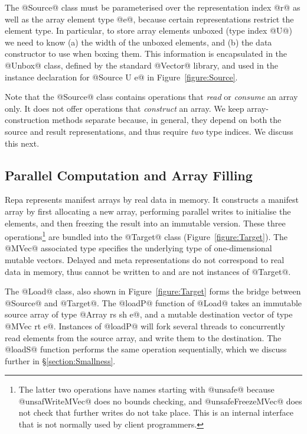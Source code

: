 The @Source@ class must be parameterised over the representation index @r@ as well as the array element type @e@, because certain representations restrict the element type. In particular, to store array elements unboxed (type index @U@) we need to know (a) the width of the unboxed elements, and (b) the data constructor to use when boxing them. This information is encapsulated in the @Unbox@ class, defined by the standard @Vector@ library, and used in the instance declaration for @Source U e@ in Figure~\ref{figure:Source}.

Note that the @Source@ class contains operations that \emph{read} or \emph{consume} an array only. It does not offer operations that \emph{construct} an array. We keep array-construction methods separate because, in general, they depend on both the source and result representations, and thus require \emph{two} type indices. We discuss this next.


\subsection{Parallel Computation and Array Filling}
\label{section:ParallelComputation}

Repa represents manifest arrays by real data in memory. It constructs a manifest array by first allocating a new array, performing parallel writes to initialise the elements, and then freezing the result into an immutable version. These three operations\footnote{The latter two operations have names starting with @unsafe@ because @unsafWriteMVec@ does no bounds checking, and @unsafeFreezeMVec@ does not check that further writes do not take place. This is an internal interface that is not normally used by client programmers.} are bundled into the @Target@ class (Figure~\ref{figure:Target}). The @MVec@ associated type specifies the underlying type of one-dimensional mutable vectors. Delayed and meta representations do not correspond to real data in memory, thus cannot be written to and are not instances of @Target@.

The @Load@ class, also shown in Figure~\ref{figure:Target} forms the bridge between @Source@ and @Target@. The @loadP@ function of @Load@ takes an immutable source array of type @Array rs sh e@, and a mutable destination vector of type @MVec rt e@. Instances of @loadP@ will fork several threads to concurrently read elements from the source array, and write them to the destination. The @loadS@ function performs the same operation sequentially, which we discuss further in \S\ref{section:Smallness}. 

